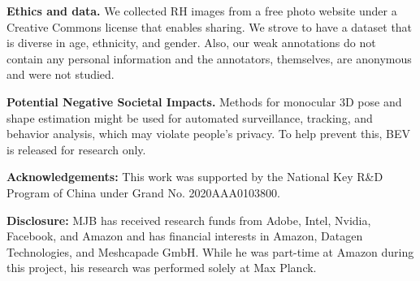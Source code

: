 \documentclass[10pt,twocolumn,letterpaper]{article}
\begin{document}
\textbf{Ethics and data.}
We collected RH images from a free photo website \cite{pexels} under a Creative Commons license that enables sharing.
We strove to have a dataset that is diverse in age, ethnicity, and gender.
Also, our weak annotations do not contain any personal information and the annotators, themselves, are anonymous and were not studied.

\textbf{Potential Negative Societal Impacts.}
Methods for monocular 3D pose and shape estimation might be used for automated surveillance, tracking, and behavior analysis, which may violate people's privacy. 
To help prevent this, BEV is released for research only.

\noindent \textbf{Acknowledgements:} This work was supported by the National Key R\&D Program of China under Grand No. 2020AAA0103800. 

\noindent \textbf{Disclosure:} MJB has received research funds
from Adobe, Intel, Nvidia, Facebook, and Amazon and has financial interests in Amazon, Datagen Technologies, and Meshcapade GmbH. While he was part-time at Amazon during this project, his research was performed solely at Max Planck. 


{\small


}
\end{document}
